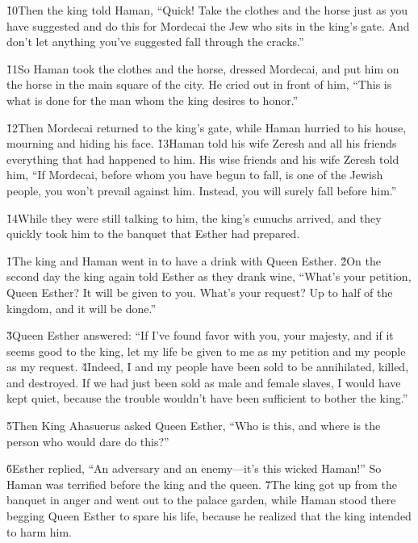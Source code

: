\v{10}Then the king told Haman, ``Quick! Take the clothes and the horse just as you have suggested and do this for Mordecai the Jew who sits in the king's gate. And don't let anything you've suggested fall through the cracks.''

\v{11}So Haman took the clothes and the horse, dressed Mordecai, and put him on the horse in the main square of the city. He cried out in front of him, ``This is what is done for the man whom the king desires to honor.''

\v{12}Then Mordecai returned to the king's gate, while Haman hurried to his house, mourning and hiding his face. \v{13}Haman told his wife Zeresh and all his friends everything that had happened to him. His wise friends and his wife Zeresh told him, ``If Mordecai, before whom you have begun to fall, is one of the Jewish people, you won't prevail against him. Instead, you will surely fall before him.''

\v{14}While they were still talking to him, the king's eunuchs arrived, and they quickly took him to the banquet that Esther had prepared.

\v{1}The king and Haman went in to have a drink with Queen Esther. \v{2}On the second day the king again told Esther as they drank wine, ``What's your petition, Queen Esther? It will be given to you. What's your request? Up to half of the kingdom, and it will be done.''

\v{3}Queen Esther answered: ``If I've found favor with you, your majesty, and if it seems good to the king, let my life be given to me as my petition and my people as my request. \v{4}Indeed, I and my people have been sold to be annihilated, killed, and destroyed. If we had just been sold as male and female slaves, I would have kept quiet, because the trouble wouldn't have been sufficient to bother the king.''

\v{5}Then King Ahasuerus asked Queen Esther, ``Who is this, and where is the person who would dare do this?''

\v{6}Esther replied, ``An adversary and an enemy---it's this wicked Haman!'' So Haman was terrified before the king and the queen. \v{7}The king got up from the banquet in anger and went out to the palace garden, while Haman stood there begging Queen Esther to spare his life, because he realized that the king intended to harm him.

